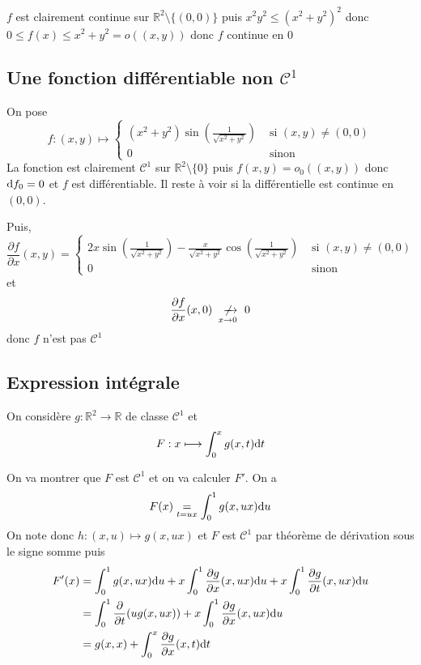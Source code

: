 $f$ est clairement continue sur $\mathbb R^2\setminus\{(0, 0)\}$ puis $x^2y^2\leq (x^2+y^2)^2$ donc $0\leq f(x)\leq x^2+y^2=o((x, y))$ donc $f$ continue en $0$

\subsection{Une fonction différentiable non \texorpdfstring{$\mathcal C^1$}{C1}}

On pose \[
    f:(x, y)\longmapsto \begin{cases}
        \displaystyle (x^2+y^2)\sin \left( \frac{1}{\sqrt{x^2+y^2}}  \right) &\text{ si } (x, y)\neq (0, 0) \\
        0 &\text{ sinon }
    \end{cases}
\]
La fonction est clairement $\mathcal C^1$ sur $\mathbb R^2\setminus\{0\}$ puis $f(x, y)=o_0((x, y))$ donc $\mathrm{d} f_0=0$ et $f$ est différentiable. Il reste à voir si la différentielle est continue en $(0, 0)$.

Puis, \[
    \frac{\partial f}{\partial x} (x, y)= \begin{cases}
        \displaystyle 2x\sin \left( \frac{1}{\sqrt{x^2+y^2}} \right)-\frac x{\sqrt{x^2+y^2}}\cos \left( \frac{1}{\sqrt{x^2+y^2}}  \right) &\text{ si } (x, y)\neq (0, 0) \\ 0 &\text{ sinon }
    \end{cases}
\]
et \[
    \frac{\partial f}{\partial x} (x, 0)\xnrightarrow[x\to 0]{} 0
\]
donc $f$ n'est pas $\mathcal C^1$

\subsection{Expression intégrale}

On considère $g:\mathbb R^2\to \mathbb R$ de classe $\mathcal C^1$ et \[
    F:x\longmapsto \int_0^xg(x, t)\mathrm{d} t
\]

On va montrer que $F$ est $\mathcal C^1$ et on va calculer $F'$.
On a \[
    F(x) \underset{t=ux}=\int_0^1g(x, ux)\mathrm{d} u
\]
On note donc $h: (x, u) \longmapsto g(x, ux)$ et $F$ est $\mathcal C^1$ par théorème de dérivation sous le signe somme puis \begin{align*}
    F'(x)&=\int_0^1 g(x, ux)\mathrm{d} u+x\int_0^1\frac{\partial g}{\partial x}(x, ux)\mathrm{d} u+x\int_0^1\frac{\partial g}{\partial t}(x, ux)\mathrm{d} u \\
         &= \int_0^1\frac{\partial}{\partial t}(ug(x, ux))+x\int_0^1 \frac{\partial g}{\partial x} (x, ux)\mathrm{d} u \\ &= g(x, x)+\int_0^x \frac{\partial g}{\partial x}(x, t)\mathrm{d} t
\end{align*}

